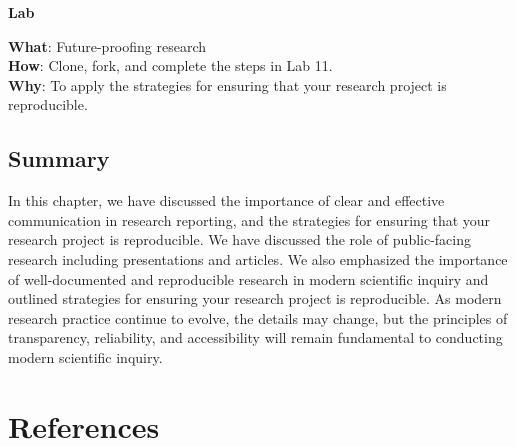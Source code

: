 \documentclass[
  letterpaper,
  krantz1]{latex/krantz-mod}
\theoremstyle{definition}
\theoremstyle{definition}
\theoremstyle{remark}
\begin{document}
\begin{tcolorbox}[enhanced jigsaw, leftrule=.75mm, colframe=quarto-callout-color-frame, left=2mm, colback=white, toprule=.15mm, breakable, arc=.35mm, opacityback=0, bottomrule=.15mm, rightrule=.15mm]

\textbf{ Lab}

\textbf{What}: Future-proofing research\\
\textbf{How}: Clone, fork, and complete the steps in Lab 11.\\
\textbf{Why}: To apply the strategies for ensuring that your research
project is reproducible.

\end{tcolorbox}

\section*{Summary}\label{summary-10}


In this chapter, we have discussed the importance of clear and effective
communication in research reporting, and the strategies for ensuring
that your research project is reproducible. We have discussed the role
of public-facing research including presentations and articles. We also
emphasized the importance of well-documented and reproducible research
in modern scientific inquiry and outlined strategies for ensuring your
research project is reproducible. As modern research practice continue
to evolve, the details may change, but the principles of transparency,
reliability, and accessibility will remain fundamental to conducting
modern scientific inquiry.


\chapter*{References}\label{references}

\end{document}
